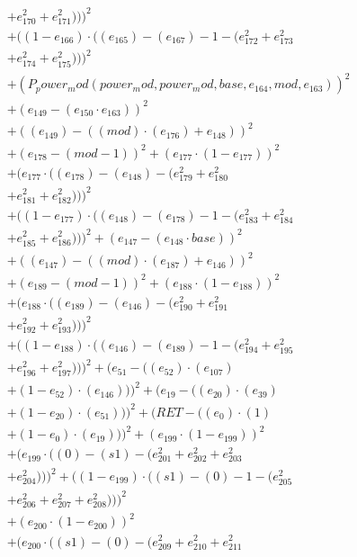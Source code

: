 \documentclass[10pt, a4paper]{article}
\begin{document}
\begin{small}
\begin{align*}
& + e_{170}^{2} + e_{171}^{2})))^{2} \\
& + ((1 - e_{166})  \cdot  ((e_{165}) - (e_{167}) - 1 - (e_{172}^{2} + e_{173}^{2} \\
& + e_{174}^{2} + e_{175}^{2})))^{2} \\
& + (P_power_mod(power_mod, power_mod, base, e_{164}, mod, e_{163}))^{2} \\
& + (e_{149} - (e_{150}  \cdot  e_{163}))^{2} \\
& + ((e_{149}) - ((mod)  \cdot  (e_{176}) + e_{148}))^{2} \\
& + (e_{178} - (mod - 1))^{2} + (e_{177}  \cdot  (1 - e_{177}))^{2} \\
& + (e_{177}  \cdot  ((e_{178}) - (e_{148}) - (e_{179}^{2} + e_{180}^{2} \\
& + e_{181}^{2} + e_{182}^{2})))^{2} \\
& + ((1 - e_{177})  \cdot  ((e_{148}) - (e_{178}) - 1 - (e_{183}^{2} + e_{184}^{2} \\
& + e_{185}^{2} + e_{186}^{2})))^{2} + (e_{147} - (e_{148}  \cdot  base))^{2} \\
& + ((e_{147}) - ((mod)  \cdot  (e_{187}) + e_{146}))^{2} \\
& + (e_{189} - (mod - 1))^{2} + (e_{188}  \cdot  (1 - e_{188}))^{2} \\
& + (e_{188}  \cdot  ((e_{189}) - (e_{146}) - (e_{190}^{2} + e_{191}^{2} \\
& + e_{192}^{2} + e_{193}^{2})))^{2} \\
& + ((1 - e_{188})  \cdot  ((e_{146}) - (e_{189}) - 1 - (e_{194}^{2} + e_{195}^{2} \\
& + e_{196}^{2} + e_{197}^{2})))^{2} + (e_{51} - ((e_{52})  \cdot  (e_{107}) \\
& + (1 - e_{52})  \cdot  (e_{146})))^{2} + (e_{19} - ((e_{20})  \cdot  (e_{39}) \\
& + (1 - e_{20})  \cdot  (e_{51})))^{2} + (RET - ((e_{0})  \cdot  (1) \\
& + (1 - e_{0})  \cdot  (e_{19})))^{2} + (e_{199}  \cdot  (1 - e_{199}))^{2} \\
& + (e_{199}  \cdot  ((0) - (s1) - (e_{201}^{2} + e_{202}^{2} + e_{203}^{2} \\
& + e_{204}^{2})))^{2} + ((1 - e_{199})  \cdot  ((s1) - (0) - 1 - (e_{205}^{2} \\
& + e_{206}^{2} + e_{207}^{2} + e_{208}^{2})))^{2} \\
& + (e_{200}  \cdot  (1 - e_{200}))^{2} \\
& + (e_{200}  \cdot  ((s1) - (0) - (e_{209}^{2} + e_{210}^{2} + e_{211}^{2} \\

\end{align*}
\end{small}
\end{document}
